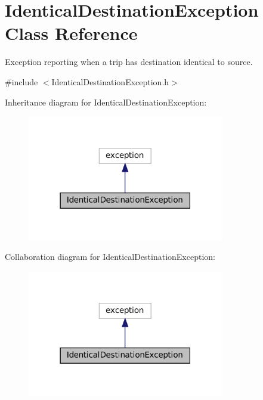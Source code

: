 \hypertarget{classIdenticalDestinationException}{}\section{Identical\+Destination\+Exception Class Reference}
\label{classIdenticalDestinationException}


Exception reporting when a trip has destination identical to source.  




{\ttfamily \#include $<$Identical\+Destination\+Exception.\+h$>$}



Inheritance diagram for Identical\+Destination\+Exception\+:
\nopagebreak
\begin{figure}[H]
\begin{center}
\leavevmode
\includegraphics[width=243pt]{classIdenticalDestinationException__inherit__graph}
\end{center}
\end{figure}


Collaboration diagram for Identical\+Destination\+Exception\+:
\nopagebreak
\begin{figure}[H]
\begin{center}
\leavevmode
\includegraphics[width=243pt]{classIdenticalDestinationException__coll__graph}
\end{center}
\end{figure}
